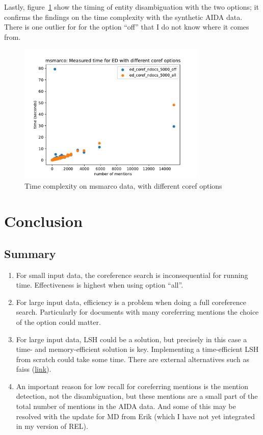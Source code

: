 \documentclass[a4paper,11pt]{article}
\numberwithin{equation}{section} %
\begin{document}
Lastly, figure~\ref{fig:timing_msmarco} show the timing of entity disambiguation with the two options; it confirms the findings on the time complexity with the synthetic AIDA data. There is one outlier for for the option ``off'' that I do not know where it comes from. 

\begin{figure}
  \centering
  \includegraphics[width = 0.8\textwidth]{../figs/timing_msmarco.pdf}
  \caption{Time complexity on msmarco data, with different coref options}
  \label{fig:timing_msmarco}
\end{figure}



\section{Conclusion}

\subsection{Summary}
\begin{enumerate}
 \item For small input data, the coreference search is inconsequential for running time. Effectiveness is highest when using option ``all''.
 \item For large input data, efficiency is a problem when doing a full coreference search. Particularly for documents with many coreferring mentions the choice of the option could matter.
 \item For large input data, LSH could be a solution, but precisely in this case a time- and memory-efficient solution is key. Implementing a time-efficient LSH from scratch could take some time. There are external alternatives such as faiss (\href{https://github.com/facebookresearch/faiss}{\underline{link}}).
 \item An important reason for low recall for coreferring mentions is the mention detection, not the disambiguation, but these mentions are a small part of the total number of mentions in the AIDA data. And some of this may be resolved with the update for MD from Erik (which I have not yet integrated in my version of REL).
\end{enumerate}
\end{document}
